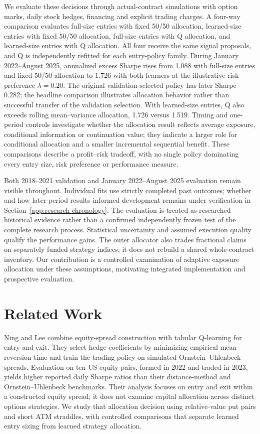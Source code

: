 \documentclass[11pt,letterpaper]{article}
\begin{document}
We evaluate these decisions through actual-contract simulations with option marks, daily stock hedges, financing and explicit trading charges. A four-way comparison evaluates full-size entries with fixed 50/50 allocation, learned-size entries with fixed 50/50 allocation, full-size entries with Q allocation, and learned-size entries with Q allocation. All four receive the same signal proposals, and Q is independently refitted for each entry-policy family. During January 2022--August 2025, annualized excess Sharpe rises from 1.088 with full-size entries and fixed 50/50 allocation to 1.726 with both learners at the illustrative risk preference \(\lambda=0.20\). The original validation-selected policy has later Sharpe 0.282; the headline comparison illustrates allocation behavior rather than successful transfer of the validation selection. With learned-size entries, Q also exceeds rolling mean--variance allocation, 1.726 versus 1.519. Timing and one-period controls investigate whether the allocation result reflects average exposure, conditional information or continuation value; they indicate a larger role for conditional allocation and a smaller incremental sequential benefit. These comparisons describe a profit--risk tradeoff, with no single policy dominating every entry size, risk preference or performance measure.

Both 2018--2021 validation and January 2022--August 2025 evaluation remain visible throughout. Individual fits use strictly completed past outcomes; whether and how later-period results informed development remains under verification in Section~\ref{app:research-chronology}. The evaluation is treated as researched historical evidence rather than a confirmed independently frozen test of the complete research process. Statistical uncertainty and assumed execution quality qualify the performance gains. The outer allocator also trades fractional claims on separately funded strategy indices; it does not rebuild a shared whole-contract inventory. Our contribution is a controlled examination of adaptive exposure allocation under these assumptions, motivating integrated implementation and prospective evaluation.
\section{Related Work}\label{sec:2}
Ning and Lee \cite{ning2024} combine equity-spread construction with tabular Q-learning for entry and exit. They select hedge coefficients by minimizing empirical mean-reversion time and train the trading policy on simulated Ornstein--Uhlenbeck spreads. Evaluation on ten US equity pairs, formed in 2022 and traded in 2023, yields higher reported daily Sharpe ratios than their distance-method and Ornstein--Uhlenbeck benchmarks. Their analysis focuses on entry and exit within a constructed equity spread; it does not examine capital allocation across distinct options strategies. We study that allocation decision using relative-value put pairs and short ATM straddles, with controlled comparisons that separate learned entry sizing from learned strategy allocation.
\end{document}
